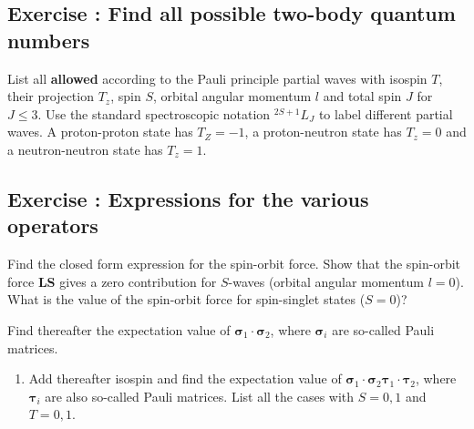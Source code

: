 \documentclass[graybox,sectrefs,envcountresetchap,open=right]{svmonodo}
\newenvironment{doconceexercise}{}{}
\newcounter{doconceexercisecounter}
\begin{document}
\begin{doconceexercise}

\subsection*{Exercise \thedoconceexercisecounter: Find all possible two-body quantum numbers}


List all \textbf{allowed} according to the Pauli principle partial waves with isospin $T$, their 
projection $T_z$, spin $S$, orbital angular momentum $l$ and total spin $J$ for $J\le 3$.
Use the standard spectroscopic notation $^{2S+1}L_J$ to label different partial waves. A proton-proton state
has $T_Z=-1$, a proton-neutron state has $T_z=0$ and a neutron-neutron state has $T_z=1$.

\end{doconceexercise}




\begin{doconceexercise}

\subsection*{Exercise \thedoconceexercisecounter: Expressions for the various operators}



Find the closed form expression for the spin-orbit force. Show that the spin-orbit force {\bf LS} gives a zero
contribution for $S$-waves (orbital angular momentum $l=0$).   What is the value of the spin-orbit force for spin-singlet states ($S=0$)?

Find thereafter the expectation value of $\mathbf{\sigma}_1\cdot\mathbf{\sigma}_2$, where $\mathbf{\sigma}_i$ are so-called Pauli matrices. 
\begin{enumerate}
\item Add thereafter isospin and find the expectation value of $\mathbf{\sigma}_1\cdot\mathbf{\sigma}_2\mathbf{\tau}_1\cdot\mathbf{\tau}_2$, where $\mathbf{\tau}_i$ are also so-called Pauli matrices. List all the cases with $S=0,1$ and $T=0,1$.
\end{enumerate}

\noindent
\end{doconceexercise}
\end{document}
